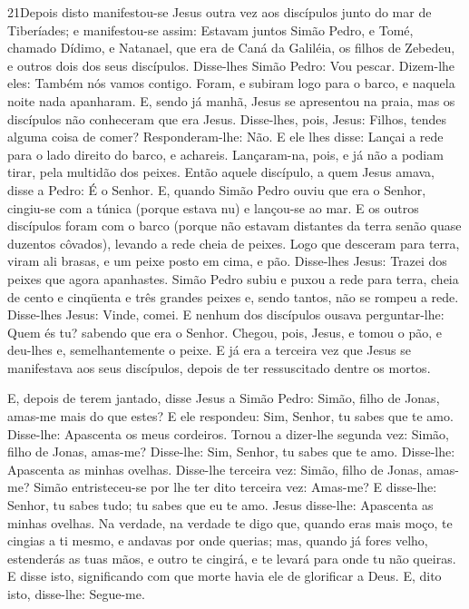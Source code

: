 \lettrine{21} Depois disto manifestou-se Jesus outra vez aos
discípulos junto do mar de Tiberíades; e manifestou-se assim:
Estavam juntos Simão Pedro, e Tomé, chamado Dídimo, e Natanael,
que era de Caná da Galiléia, os filhos de Zebedeu, e outros dois dos
seus discípulos. Disse-lhes Simão Pedro: Vou pescar. Dizem-lhe
eles: Também nós vamos contigo. Foram, e subiram logo para o barco,
e naquela noite nada apanharam. E, sendo já manhã, Jesus se
apresentou na praia, mas os discípulos não conheceram que era Jesus.
Disse-lhes, pois, Jesus: Filhos, tendes alguma coisa de comer?
Responderam-lhe: Não. E ele lhes disse: Lançai a rede para o
lado direito do barco, e achareis. Lançaram-na, pois, e já não a
podiam tirar, pela multidão dos peixes. Então aquele discípulo,
a quem Jesus amava, disse a Pedro: É o Senhor. E, quando Simão Pedro
ouviu que era o Senhor, cingiu-se com a túnica (porque estava nu) e
lançou-se ao mar. E os outros discípulos foram com o barco
(porque não estavam distantes da terra senão quase duzentos
côvados), levando a rede cheia de peixes. Logo que desceram para
terra, viram ali brasas, e um peixe posto em cima, e pão.
Disse-lhes Jesus: Trazei dos peixes que agora apanhastes.
Simão Pedro subiu e puxou a rede para terra, cheia de cento e
cinqüenta e três grandes peixes e, sendo tantos, não se rompeu a
rede. Disse-lhes Jesus: Vinde, comei. E nenhum dos discípulos
ousava perguntar-lhe: Quem és tu? sabendo que era o Senhor.
Chegou, pois, Jesus, e tomou o pão, e deu-lhes e,
semelhantemente o peixe. E já era a terceira vez que Jesus se
manifestava aos seus discípulos, depois de ter ressuscitado dentre
os mortos.

E, depois de terem jantado, disse Jesus a Simão Pedro: Simão,
filho de Jonas, amas-me mais do que estes? E ele respondeu: Sim,
Senhor, tu sabes que te amo. Disse-lhe: Apascenta os meus cordeiros.
Tornou a dizer-lhe segunda vez: Simão, filho de Jonas,
amas-me? Disse-lhe: Sim, Senhor, tu sabes que te amo. Disse-lhe:
Apascenta as minhas ovelhas. Disse-lhe terceira vez: Simão,
filho de Jonas, amas-me? Simão entristeceu-se por lhe ter dito
terceira vez: Amas-me? E disse-lhe: Senhor, tu sabes tudo; tu sabes
que eu te amo. Jesus disse-lhe: Apascenta as minhas ovelhas.
Na verdade, na verdade te digo que, quando eras mais moço, te
cingias a ti mesmo, e andavas por onde querias; mas, quando já fores
velho, estenderás as tuas mãos, e outro te cingirá, e te levará para
onde tu não queiras. E disse isto, significando com que morte
havia ele de glorificar a Deus. E, dito isto, disse-lhe: Segue-me.

